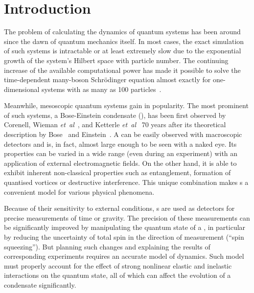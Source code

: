 \chapter{Introduction}

The problem of calculating the dynamics of quantum systems has been around since the dawn of quantum mechanics itself.
In most cases, the exact simulation of such systems is intractable or at least extremely slow due to the exponential growth of the system's Hilbert space with particle number.
The continuing increase of the available computational power has made it possible to solve the time-dependent many-boson Schr\"odinger equation almost exactly for one-dimensional systems with as many as 100 particles~\cite{Sakmann2009}.

Meanwhile, mesoscopic quantum systems gain in popularity.
The most prominent of such systems, a Bose-Einstein condensate (), has been first observed by Corenell, Wieman \textit{et~al}~\cite{Anderson1995}, and Ketterle \textit{et~al}~\cite{Davis1995} 70 years after its theoretical description by Bose~\cite{Bose1924} and Einstein~\cite{Einstein1924,Einstein1925}.
A  can be easily observed with macroscopic detectors and is, in fact, almost large enough to be seen with a naked eye.
Its properties can be varied in a wide range (even during an experiment) with an application of external electromagnetic fields.
On the other hand, it is able to exhibit inherent non-classical properties such as entanglement, formation of quantised vortices or destructive interference.
This unique combination makes s a convenient model for various physical phenomena.

Because of their sensitivity to external conditions, s are used as detectors for precise measurements of time or gravity.
The precision of these measurements can be significantly improved by manipulating the quantum state of a , in particular by reducing the uncertainty of total spin in the direction of measurement (``spin squeezing'').
But planning such changes and explaining the results of corresponding experiments requires an accurate model of  dynamics.
Such model must properly account for the effect of strong nonlinear elastic and inelastic interactions on the quantum state, all of which can affect the evolution of a condensate significantly.

